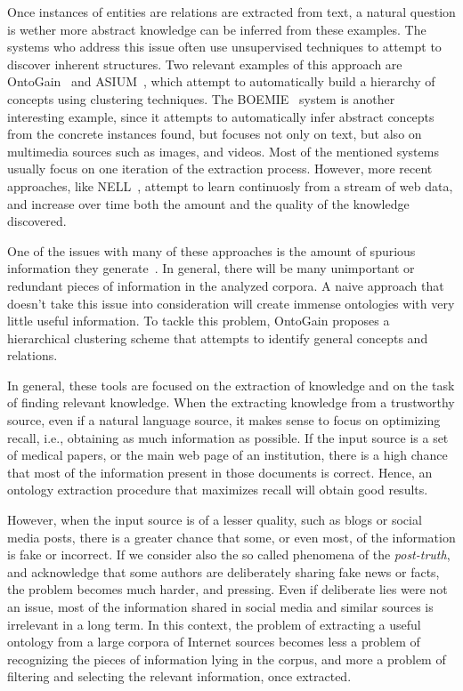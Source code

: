     Once instances of entities are relations are extracted from text, a natural question is
      wether more abstract knowledge can be inferred from these examples.
      The systems who address this issue often use unsupervised techniques to attempt
      to discover inherent structures. Two relevant examples of this approach
      are OntoGain~\cite{drymonas2010unsupervised} and ASIUM~\cite{asium}, 
      which attempt to automatically build a hierarchy of concepts using clustering techniques.
      The BOEMIE~\cite{boemie} system is another interesting example, since it 
      attempts to automatically infer abstract concepts from the concrete instances found,
      but focuses not only on text, but also on multimedia sources such as images, and videos.
      Most of the mentioned systems usually focus on one iteration of the extraction process.
      However, more recent approaches, like NELL~\cite{mitchell2015never}, attempt
      to learn continuosly from a stream of web data, and increase over time
      both the amount and the quality of the knowledge discovered.
      
    One of the issues with many of these approaches is the amount of spurious
    information they generate~\cite{Maimon:2015:OLT:2870689.2870690}.
    In general, there will be many unimportant
    or redundant pieces of information in the analyzed corpora. A naive
    approach that doesn't take this issue into consideration will create
    immense ontologies with very little useful information. To tackle
    this problem, OntoGain proposes a hierarchical clustering scheme
    that attempts to identify general concepts and relations.
  
    In general, these tools are focused on the extraction of knowledge and
    on the task of finding relevant knowledge.
      When the extracting knowledge from a trustworthy source, even if a natural
      language source, it makes sense to
      focus on optimizing recall, i.e., obtaining as much information as possible.
      If the input source is a set of medical papers, or the main
      web page of an institution, there is a high chance that most of the information
      present in those documents is correct. Hence, an ontology extraction procedure
      that maximizes recall will obtain good results.
      
      However, when the input source is of a lesser quality, such as blogs or
      social media posts, there is a greater chance that some, or even most,
      of the information is fake or incorrect.
      If we consider also the so called phenomena of the \textit{post-truth},
      and acknowledge that some authors are deliberately sharing fake news
      or facts, the problem becomes much harder, and pressing.
      Even if deliberate lies were not an issue, most of the information shared
      in social media and similar sources is irrelevant in a long term.
      In this context, the problem of extracting a useful ontology from a large
      corpora of Internet sources becomes less a problem of recognizing the pieces
      of information lying in the corpus, and more a problem of filtering and selecting
      the relevant information, once extracted.
  
